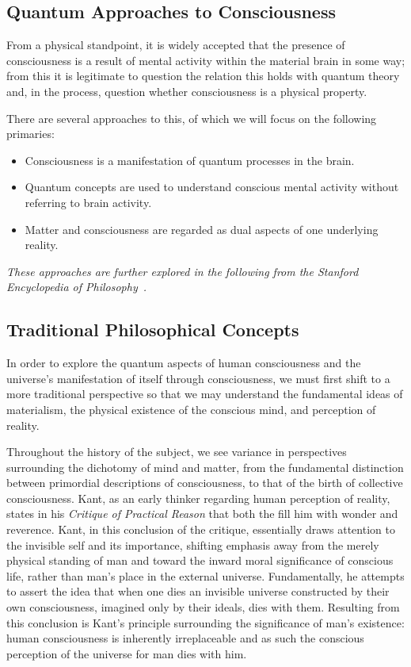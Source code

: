 \documentclass[openany,oneside,12pt,hidelinks]{book}
\begin{document}
\subsection{Quantum Approaches to Consciousness}

From a physical standpoint, it is widely accepted that the presence of
consciousness is a result of mental activity within the material brain in some
way; from this it is legitimate to question the relation this holds with
quantum theory and, in the process, question whether consciousness is a
physical property.

There are several approaches to this, of which we will focus on the following
primaries:
\begin{itemize}
  \item Consciousness is a manifestation of quantum processes in the brain.
  \item Quantum concepts are used to understand conscious mental activity
        without referring to brain activity.
  \item Matter and consciousness are regarded as dual aspects of one
        underlying reality.
\end{itemize}
\emph{These approaches are further explored in the following from the
  Stanford Encyclopedia of Philosophy~\cite{sep-qt-consciousness}.}


\subsection{Traditional Philosophical Concepts}

In order to explore the quantum aspects of human consciousness and the
universe's manifestation of itself through consciousness, we must first shift
to a more traditional perspective so that we may understand the fundamental
ideas of materialism, the physical existence of the conscious mind, and
perception of reality.

Throughout the history of the subject, we see variance in perspectives
surrounding the dichotomy of mind and matter, from the fundamental
distinction between primordial descriptions of consciousness, to that of the
birth of collective consciousness. Kant, as an early thinker regarding human
perception of reality, states in his \emph{Critique of Practical Reason} that
both the 
fill him with wonder and reverence.
Kant, in this conclusion of the critique, essentially draws attention to the
invisible self and its importance, shifting emphasis away from the merely
physical standing of man and toward the inward moral significance of conscious
life, rather than man's place in the external universe. Fundamentally, he
attempts to assert
the idea that when one dies an invisible universe constructed by their own
consciousness, imagined only by their ideals, dies with them. Resulting from
this conclusion is Kant's principle surrounding the significance of man's
existence: human consciousness is inherently irreplaceable and as such the
conscious perception of the universe for man dies with him.
\end{document}
